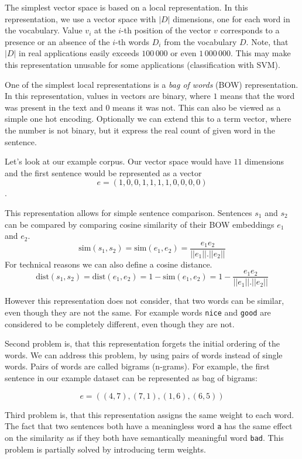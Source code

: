     The simplest vector space is based on a local representation.
    In this representation, we use a vector space with $|D|$ dimensions, one for each word in the vocabulary.
    Value $v_i$ at the $i$-th position of the vector $v$ corresponds to a presence or an absence of the $i$-th words $D_i$ from the vocabulary $D$.
    Note, that $|D|$ in real applications easily exceeds $100\,000$ or even $1\,000\,000$.
    This may make this representation unusable for some applications (classification with SVM).
    
    One of the simplest local representations is a \textit{bag of words} (BOW) representation. 
    In this representation, values in vectors are binary, where $1$ means that the word was present in the text and $0$ means it was not.
    This can also be viewed as a simple one hot encoding.
    Optionally we can extend this to a term vector, where the number is not binary, but it express the real count of given word in the sentence.
    
    Let's look at our example corpus. 
    Our vector space would have $11$ dimensions and the first sentence would be represented as a vector
    $$e = (1, 0, 0, 1, 1, 1, 1, 0, 0, 0, 0)$$.
    
    This representation allows for simple sentence comparison. 
    Sentences $s_1$ and $s_2$ can be compared by comparing cosine similarity of their BOW embeddings $e_1$ and $e_2$.
    $$\mathrm{sim}(s_1, s_2) = \mathrm{sim}(e_1, e_2) = \frac{e_1 e_2}{||e_1||.||e_2||}$$
    For technical reasons we can also define a cosine distance. 
    $$\mathrm{dist}(s_1, s_2) = \mathrm{dist}(e_1, e_2) = 1- \mathrm{sim}(e_1, e_2) = 1 - \frac{e_1 e_2}{||e_1||.||e_2||}$$
    
    However this representation does not consider, that two words can be similar, even though they are not the same.
    For example words \texttt{nice} and \texttt{good} are considered to be completely different, even though they are not. 
    
    Second problem is, that this representation forgets the initial ordering of the words.
    We can address this problem, by using pairs of words instead of single words. 
    Pairs of words are called bigrams (n-grams).
    For example, the first sentence in our example dataset can be represented as bag of bigrams:
    
    $$e = ((4,7),(7,1),(1,6),(6,5))$$
    
    Third problem is, that this representation assigns the same weight to each word.
    The fact that two sentences both have a meaningless word \texttt{a} has the same effect on the similarity as if they both have semantically meaningful word \texttt{bad}. 
    This problem is partially solved by introducing term weights.
    
